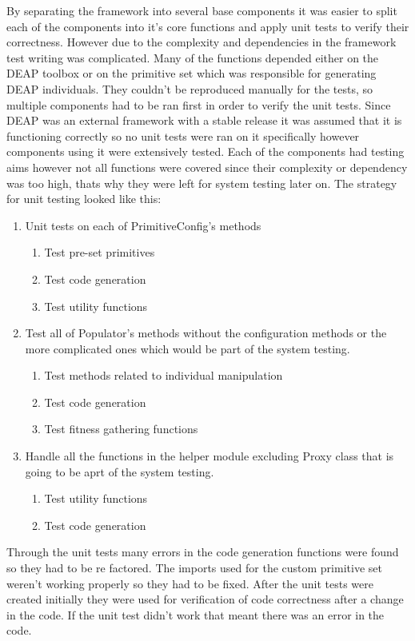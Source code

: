 By separating the framework into several base components it was easier to split each of the components into
it's core functions and apply unit tests to verify their correctness. However due to the complexity and
dependencies in the framework test writing was complicated. Many of the functions depended either on 
the DEAP toolbox or on the primitive set which was responsible for generating DEAP individuals. They couldn't
be reproduced manually for the tests, so multiple components had to be ran first in order to verify the unit tests.
Since DEAP was an external framework with a stable release it was assumed that it is functioning correctly so no 
unit tests were ran on it specifically however components using it were extensively tested. Each of the components
had testing aims however not all functions were covered since their complexity or dependency was too high, thats why
they were left for system testing later on. The strategy for unit testing looked like this:

\begin{enumerate}
  \item Unit tests on each of PrimitiveConfig's methods
  \begin{enumerate}
	\item Test pre-set primitives
	\item Test code generation
	\item Test utility functions
  \end{enumerate}  
  \item Test all of Populator's methods without the configuration methods or the more complicated ones which would be part of the system testing.
  \begin{enumerate}
	\item Test methods related to individual manipulation
	\item Test code generation
	\item Test fitness gathering functions 
  \end{enumerate}  
  \item Handle all the functions in the helper module excluding Proxy class that is going to be aprt of the system testing.
  \begin{enumerate}
	\item Test utility functions
	\item Test code generation
  \end{enumerate} 
\end{enumerate}

Through the unit tests many errors in the code generation functions were found so they had to be re factored. The imports used for the custom primitive set
weren't working properly so they had to be fixed. After the unit tests were created initially they were used for verification of code correctness after
a change in the code. If the unit test didn't work that meant there was an error in the code.
